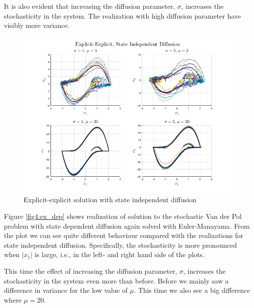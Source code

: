 It is also evident that increasing the diffusion parameter, $\sigma$, increases the stochasticity in the system. The realization with high diffusion parameter have visibly more variance. 

\begin{figure}[H]
    \centering
    \includegraphics[width=\textwidth]{graphics/opg4/ex_indep.png}
    \caption{Explicit-explicit solution with state independent diffusion}
    \label{fig4:ex_indep}
\end{figure}


Figure \ref{fig4:ex_dep} shows realization of solution to the stochastic Van der Pol problem with state dependent diffusion again solved with Euler-Manayama. From the plot we can see quite different behaviour compared with the realizations for state independent diffusion. Specifically, the stochasticity is more pronounced when $|x_1|$ is large, i.e., in the left- and right hand side of the plots.  

This time the effect of increasing the diffusion parameter, $\sigma$, increases the stochasticity in the system even more than before. Before we mainly saw a difference in variance for the low value of $\mu$. This time we also see a big difference where $\mu=20$.

